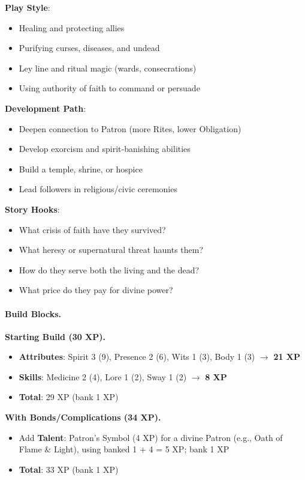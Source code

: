 \textbf{Play Style}:
\begin{itemize}
\item Healing and protecting allies
\item Purifying curses, diseases, and undead
\item Ley line and ritual magic (wards, consecrations)
\item Using authority of faith to command or persuade
\end{itemize}

\textbf{Development Path}:
\begin{itemize}
\item Deepen connection to Patron (more Rites, lower Obligation)
\item Develop exorcism and spirit‑banishing abilities
\item Build a temple, shrine, or hospice
\item Lead followers in religious/civic ceremonies
\end{itemize}

\textbf{Story Hooks}:
\begin{itemize}
\item What crisis of faith have they survived?
\item What heresy or supernatural threat haunts them?
\item How do they serve both the living and the dead?
\item What price do they pay for divine power?
\end{itemize}

\paragraph{Build Blocks.}
\textbf{Starting Build (30 XP).}
\begin{itemize}
\item \textbf{Attributes}: Spirit 3 (9), Presence 2 (6), Wits 1 (3), Body 1 (3) $\rightarrow$ \textbf{21 XP}
\item \textbf{Skills}: Medicine 2 (4), Lore 1 (2), Sway 1 (2) $\rightarrow$ \textbf{8 XP}
\item \textbf{Total}: 29 XP (bank 1 XP)
\end{itemize}
\textbf{With Bonds/Complications (34 XP).}
\begin{itemize}
\item Add \textbf{Talent}: Patron’s Symbol (4 XP) for a divine Patron (e.g., Oath of Flame \& Light), using banked 1 + 4 = 5 XP; bank 1 XP
\item \textbf{Total}: 33 XP (bank 1 XP)
\end{itemize}

